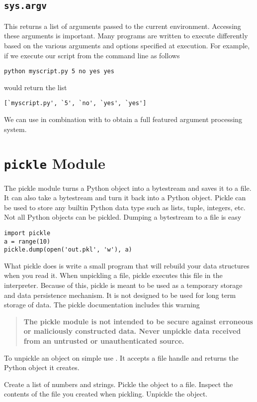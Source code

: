 \subsection*{\texttt{sys.argv}}
This returns a list of arguments passed to the current environment.  Accessing these arguments is important.  Many programs are written to execute differently based on the various arguments and options specified at execution.  For example, if we execute our script from the command line as follows
\begin{verbatim}
python myscript.py 5 no yes yes
\end{verbatim}
 would return the list
\begin{verbatim}
[`myscript.py', `5', `no', `yes', `yes']
\end{verbatim}
We can use  in combination with  to obtain a full featured argument processing system.

\section*{\texttt{pickle} Module}
The pickle module turns a Python object into a bytestream and saves it to a file.
It can also take a bytestream and turn it back into a Python object.
Pickle can be used to store any builtin Python data type such as lists, tuple, integers, etc.
Not all Python objects can be pickled.
Dumping a bytestream to a file is easy
\begin{lstlisting}
import pickle
a = range(10)
pickle.dump(open('out.pkl', 'w'), a)
\end{lstlisting}
What pickle does is write a small program that will rebuild your data structures when you read it.
When unpickling a file, pickle executes this file in the interpreter.  Because of this,
pickle is meant to be used as a temporary storage and data persistence mechanism.  It is not designed
to be used for long term storage of data.  The pickle documentation includes this warning
\begin{quote}
\textbf{The pickle module is not intended to be secure against erroneous or maliciously constructed data. Never unpickle data received from an untrusted or unauthenticated source.}
\end{quote}
To unpickle an object on simple use .  It accepts a file handle and returns the Python object it creates.

\begin{problem}
Create a list of numbers and strings.  Pickle the object to a file.  Inspect the contents of the file you created when pickling.  Unpickle the object.
\end{problem}

